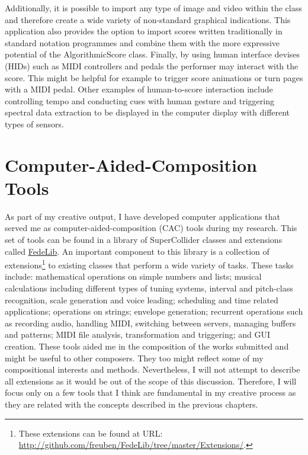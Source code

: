 Additionally, it is possible to import any type of image and video within the class and therefore create a wide variety of non-standard graphical indications. This application also provides the option to import scores written traditionally in standard notation programmes and combine them with the more expressive potential of the AlgorithmicScore class. Finally, by using human interface devises (HIDs) such as MIDI controllers and pedals the performer may interact with the score. This might be helpful for example to trigger score animations or turn pages with a MIDI pedal. Other examples of human-to-score interaction include controlling tempo and conducting cues with human gesture and triggering spectral data extraction to be displayed in the computer display with different types of sensors. 

\section{Computer-Aided-Composition Tools}

As part of my creative output, I have developed computer applications that served me as computer-aided-composition (CAC) tools during my research. This set of tools can be found in a library of  SuperCollider classes and extensions called \href{http://github.com/freuben/FedeLib}{FedeLib}. An important component to this library is a collection of extensions\footnote{These extensions can be found at URL: \href{http://github.com/freuben/FedeLib/tree/master/Extensions/}{http://github.com/freuben/FedeLib/tree/master/Extensions/}.} to existing classes that perform a wide variety of tasks. These tasks include: mathematical operations on simple numbers and lists; musical calculations including different types of tuning systems, interval and pitch-class recognition, scale generation and voice leading; scheduling and time related applications; operations on strings; envelope generation; recurrent operations such as recording audio, handling MIDI, switching between servers, managing buffers and patterns; MIDI file analysis, transformation and triggering; and GUI creation. These tools aided me in the composition of the works submitted and might be useful to other composers. They too might reflect some of my compositional interests and methods. Nevertheless, I will not attempt to describe all extensions as it would be out of the scope of this discussion. Therefore, I will focus only on a few tools that I think are fundamental in my creative process as they are related with the concepts described in the previous chapters.

